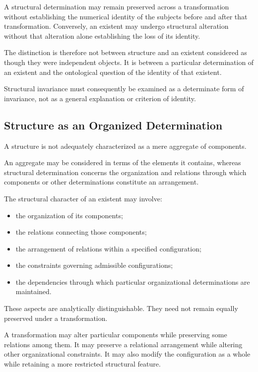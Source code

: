 A structural determination may remain preserved
across a transformation without establishing the
numerical identity of the subjects before and after
that transformation. Conversely, an existent may
undergo structural alteration without that alteration
alone establishing the loss of its identity.

The distinction is therefore not between structure
and an existent considered as though they were
independent objects. It is between a particular
determination of an existent and the ontological
question of the identity of that existent.

Structural invariance must consequently be examined
as a determinate form of invariance, not as a general
explanation or criterion of identity.

\subsection{Structure as an Organized Determination}

A structure is not adequately characterized as
a mere aggregate of components.

An aggregate may be considered in terms of the
elements it contains, whereas structural determination
concerns the organization and relations through
which components or other determinations constitute
an arrangement.

The structural character of an existent may involve:

\begin{itemize}
    \item the organization of its components;
    \item the relations connecting those components;
    \item the arrangement of relations within a
          specified configuration;
    \item the constraints governing admissible
          configurations;
    \item the dependencies through which particular
          organizational determinations are maintained.
\end{itemize}

These aspects are analytically distinguishable.
They need not remain equally preserved under
a transformation.

A transformation may alter particular components
while preserving some relations among them. It
may preserve a relational arrangement while
altering other organizational constraints.
It may also modify the configuration as a whole
while retaining a more restricted structural feature.

